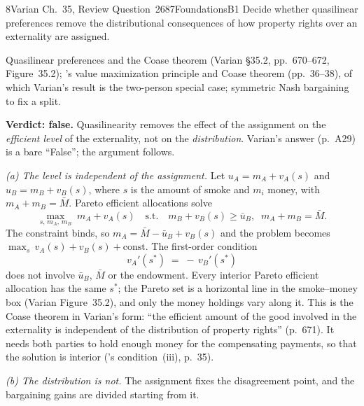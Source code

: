 \begin{exsol}{8}{Varian Ch.~35, Review Question~2}{687}{Foundations}{B1}
\asked Decide whether quasilinear preferences remove the distributional consequences of how
property rights over an externality are assigned.

\method Quasilinear preferences and the Coase theorem (Varian \S35.2, pp.~670--672, Figure~35.2);
\MR's value maximization principle and Coase theorem (pp.~36--38), of which Varian's result is the
two-person special case; symmetric Nash bargaining to fix a split.

\solution
\textbf{Verdict: false.} Quasilinearity removes the effect of the assignment on the
\emph{efficient level} of the externality, not on the \emph{distribution}. Varian's answer
(p.~A29) is a bare ``False''; the argument follows.

\emph{(a) The level is independent of the assignment.} Let $u_A = m_A + v_A(s)$ and
$u_B = m_B + v_B(s)$, where $s$ is the amount of smoke and $m_i$ money, with
$m_A + m_B = \bar M$. Pareto efficient allocations solve
\[
  \max_{s,\,m_A,\,m_B}\; m_A + v_A(s) \quad\text{s.t.}\quad m_B + v_B(s) \ge \bar u_B,\;\;
  m_A + m_B = \bar M .
\]
The constraint binds, so $m_A = \bar M - \bar u_B + v_B(s)$ and the problem becomes
$\max_s\, v_A(s) + v_B(s) + \text{const}$. The first-order condition
\[
  v_A'(s^*) \;=\; -\,v_B'(s^*)
\]
does not involve $\bar u_B$, $\bar M$ or the endowment. Every interior Pareto efficient
allocation has the same $s^*$; the Pareto set is a horizontal line in the smoke--money box
(Varian Figure~35.2), and only the money holdings vary along it. This is the Coase theorem in
Varian's form: ``the efficient amount of the good involved in the externality is independent of
the distribution of property rights'' (p.~671). It needs both parties to hold enough money for the
compensating payments, so that the solution is interior (\MR's condition~(iii), p.~35).

\emph{(b) The distribution is not.} The assignment fixes the disagreement point, and the
bargaining gains are divided starting from it.


\end{exsol}
